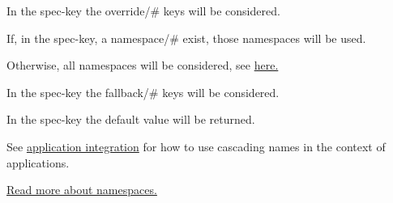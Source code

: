 \begin{DoxyEnumerate}
\item In the {\ttfamily spec}-\/key the {\ttfamily override/\#} keys will be considered.
\item If, in the {\ttfamily spec}-\/key, a {\ttfamily namespace/\#} exist, those namespaces will be used.
\item Otherwise, all namespaces will be considered, see \hyperlink{doc_help_elektra-namespaces_md}{here.}
\item In the {\ttfamily spec}-\/key the {\ttfamily fallback/\#} keys will be considered.
\item In the {\ttfamily spec}-\/key the {\ttfamily default} value will be returned.
\end{DoxyEnumerate}

See \hyperlink{doc_tutorials_application-integration_md}{application integration} for how to use cascading names in the context of applications.

\hyperlink{doc_help_elektra-namespaces_md}{Read more about namespaces.} 